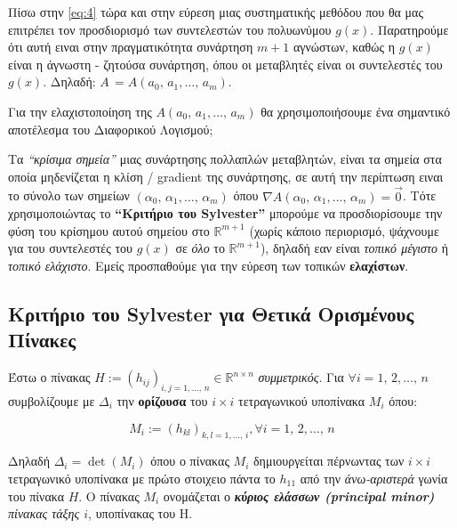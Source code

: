 \documentclass[12pt]{article}
\begin{document}
Πίσω στην \eqref{eq:4} τώρα και στην εύρεση μιας συστηματικής μεθόδου
που θα μας επιτρέπει τον προσδιορισμό των συντελεστών του πολυωνύμου
\(g(x)\). Παρατηρούμε ότι αυτή ειναι στην πραγματικότητα συνάρτηση
\(m+1\) αγνώστων, καθώς η \(g(x)\) είναι η άγνωστη - ζητούσα συνάρτηση,
όπου οι μεταβλητές είναι οι συντελεστές του \(g(x)\). Δηλαδή:
\(A \, = A(a_0, \, a_1,\dots, \, a_m)\).

Για την ελαχιστοποίηση της \(A(a_0, \, a_1,\dots, \, a_m)\) θα
χρησιμοποιήσουμε ένα σημαντικό αποτέλεσμα του Διαφορικού Λογισμού;

Τα \emph{``κρίσιμα σημεία''} μιας συνάρτησης πολλαπλών μεταβλητών, είναι
τα σημεία στα οποία μηδενίζεται η κλίση / gradient της συνάρτησης, σε
αυτή την περίπτωση ειναι το σύνολο των σημείων
\((\alpha_0, \, \alpha_1,\dots, \, \alpha_m)\) όπου
\(\nabla A(\alpha_0, \, \alpha_1,\dots, \, \alpha_m) = \vec{0}\). Τότε
χρησιμοποιώντας το \textbf{``Κριτήριο του Sylvester''} μπορούμε να
προσδιορίσουμε την φύση του κρίσημου αυτού σημείου στο
\(\mathbb{R}^{m+1}\) (χωρίς κάποιο περιορισμό, ψάχνουμε για του
συντελεστές του \(g(x)\) σε \emph{όλο} το \(\mathbb{R}^{m+1}\)), δηλαδή
εαν είναι \emph{τοπικό μέγιστο} ή \emph{τοπικό ελάχιστο}. Εμείς
προσπαθούμε για την εύρεση των τοπικών \textbf{ελαχίστων}.

    

    \hypertarget{kux3c1ux3b9ux3c4ux3aeux3c1ux3b9ux3bf-ux3c4ux3bfux3c5-sylvester-ux3b3ux3b9ux3b1-ux3b8ux3b5ux3c4ux3b9ux3baux3ac-ux3bfux3c1ux3b9ux3c3ux3bcux3adux3bdux3bfux3c5ux3c2-ux3c0ux3afux3bdux3b1ux3baux3b5ux3c2}{%
\subsection{\texorpdfstring{{Κριτήριο του Sylvester για Θετικά
Ορισμένους Πίνακες
}}{Kριτήριο του Sylvester για Θετικά Ορισμένους Πίνακες }}}

Έστω ο πίνακας
\(H := (h_{ij})_{i,j=1, \dots, \, n} \in \mathbb{R}^{n \times n}\)
\emph{συμμετρικός}. Για \(\forall i=1, \, 2, \dots, \, n\) συμβολίζουμε
με \(\Delta_i\) την \textbf{ορίζουσα} του \(i \times i\) τετραγωνικού
υποπίνακα \(M_i\) όπου:

\[
M_i := (h_{kl})_{k,l=1, \dots, \, i} , \forall i=1, \, 2, \dots, \, n \nonumber
\]

Δηλαδή \(\Delta_i = \det (M_i)\) όπου ο πίνακας \(M_i\) δημιουργείται
πέρνωντας των \(i \times i\) τετραγωνικό υποπίνακα με πρώτο στοιχειο
πάντα το \(h_{11}\) από την \emph{άνω-αριστερά} γωνία του πίνακα \(H\).
O πίνακας \(M_i\) ονομάζεται ο \emph{\textbf{κύριος ελάσσων (principal
minor)} πίνακας τάξης \(i\)}, υποπίνακας του H.
\end{document}
